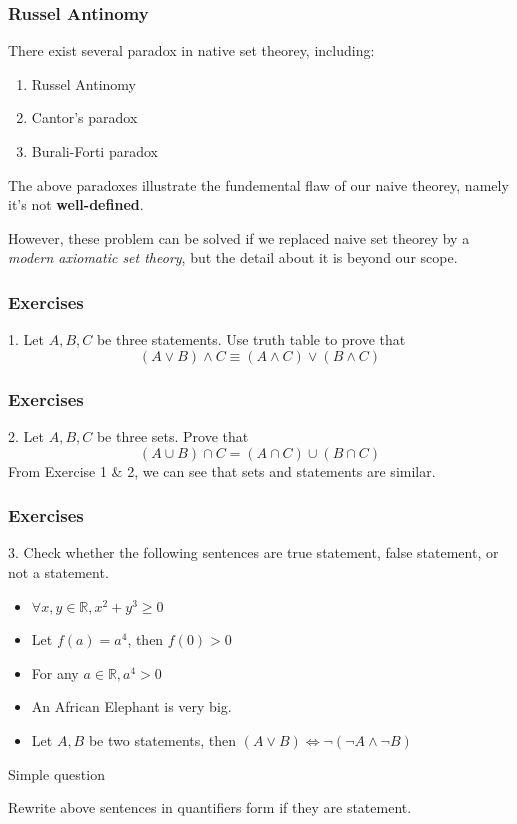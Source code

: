 \documentclass[12pt, t]{beamer}
\renewcommand{\emph}[1]{{\color{Turquoise3}\textsl{#1}}}
\begin{document}
\begin{frame}
    \frametitle{Russel Antinomy}
    There exist several paradox in native set theorey, including:\\
    \begin{enumerate}
        \item Russel Antinomy
        \item Cantor's paradox
        \item Burali-Forti paradox
    \end{enumerate}
    \par \hspace{1em} The above paradoxes illustrate the fundemental flaw of our naive theorey, namely
    it's not \textbf{well-defined}.\\
    \par \hspace{1em} However, these problem can be solved if we replaced naive set theorey by a
    \emph{modern axiomatic set theory}, but the detail about it is beyond our scope.\\
\end{frame}

\begin{frame}
    \frametitle{Exercises}
    1. Let $A, B, C$ be three statements. Use truth table to prove that
    \begin{equation*}
        (A\vee B)\wedge C \equiv (A\wedge C)\vee (B\wedge C)
    \end{equation*}
\end{frame}

\begin{frame}
    \frametitle{Exercises}
    2. Let $A, B, C$ be three sets. Prove that
    \begin{equation*}
        (A\cup B)\cap C =(A\cap C)\cup (B\cap C)
    \end{equation*}
    From Exercise 1 \& 2, we can see that sets and statements are similar.
\end{frame}

\begin{frame}
    \frametitle{Exercises}
    3. Check whether the following sentences are true statement, false statement, or not a statement.
    \begin{itemize}
        \item $\forall x, y\in \mathbb{R}, x^2+y^3\geq 0$
        \item Let  $f(a)=a^4$, then $f(0)>0$
        \item For any $a\in \mathbb{R}, a^4>0$
        \item An African Elephant is very big.
        \item Let $A, B$ be two statements, then $(A\vee B)\Leftrightarrow\neg(\neg A\wedge\neg B)$
    \end{itemize}
    Simple question
    \begin{center}
        Rewrite above sentences in quantifiers form if they are statement.
    \end{center}

\end{frame}
\end{document}
